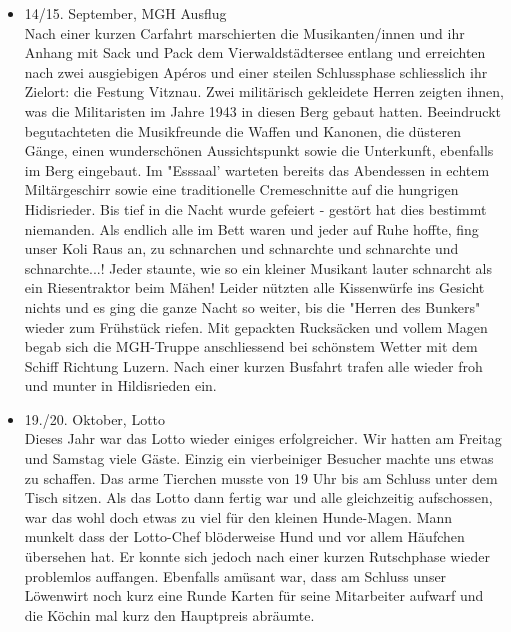 \begin{history}
\begin{itemize}
        \item 14/15. September, MGH Ausflug\\
              Nach einer kurzen Carfahrt marschierten die Musikanten/innen und ihr
              Anhang mit Sack und Pack dem Vierwaldstädtersee entlang und erreichten
              nach zwei ausgiebigen Apéros und einer steilen Schlussphase schliesslich
              ihr Zielort: die Festung Vitznau. Zwei militärisch gekleidete Herren
              zeigten ihnen, was die Militaristen im Jahre 1943 in diesen Berg gebaut
              hatten. Beeindruckt begutachteten die Musikfreunde die Waffen und
              Kanonen, die düsteren Gänge, einen wunderschönen Aussichtspunkt sowie
              die Unterkunft, ebenfalls im Berg eingebaut. Im "Esssaal' warteten
              bereits das Abendessen in echtem Miltärgeschirr sowie eine traditionelle
              Cremeschnitte auf die hungrigen Hidisrieder. Bis tief in die Nacht wurde
              gefeiert - gestört hat dies bestimmt niemanden. Als endlich alle im Bett
              waren und jeder auf Ruhe hoffte, fing unser Koli Raus an, zu schnarchen
              und schnarchte und schnarchte und schnarchte...! Jeder staunte, wie so
              ein kleiner Musikant lauter schnarcht als ein Riesentraktor beim Mähen!
              Leider nützten alle Kissenwürfe ins Gesicht nichts und es ging die ganze
              Nacht so weiter, bis die "Herren des Bunkers" wieder zum Frühstück
              riefen. Mit gepackten Rucksäcken und vollem Magen begab sich die
              MGH-Truppe anschliessend bei schönstem Wetter mit dem Schiff Richtung
              Luzern. Nach einer kurzen Busfahrt trafen alle wieder froh und munter in
              Hildisrieden ein.

        \item 19./20. Oktober, Lotto\\
              Dieses Jahr war das Lotto wieder einiges erfolgreicher. Wir hatten am
              Freitag und Samstag viele Gäste. Einzig ein vierbeiniger Besucher machte
              uns etwas zu schaffen. Das arme Tierchen musste von 19 Uhr bis am
              Schluss unter dem Tisch sitzen. Als das Lotto dann fertig war und alle
              gleichzeitig aufschossen, war das wohl doch etwas zu viel für den
              kleinen Hunde-Magen. Mann munkelt dass der Lotto-Chef blöderweise Hund
              und vor allem Häufchen übersehen hat. Er konnte sich jedoch nach einer
              kurzen Rutschphase wieder problemlos auffangen. Ebenfalls amüsant war,
              dass am Schluss unser Löwenwirt noch kurz eine Runde Karten für seine
              Mitarbeiter aufwarf und die Köchin mal kurz den Hauptpreis abräumte.


\end{itemize}
\end{history}
